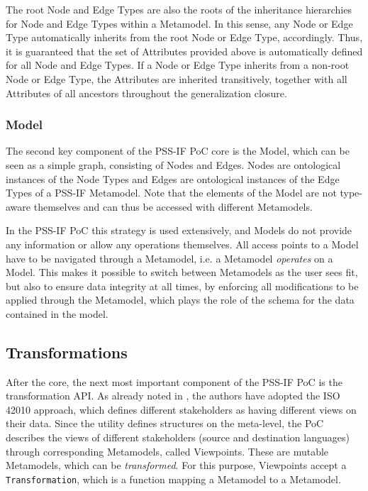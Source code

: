 The root Node and Edge Types are also the roots of the inheritance hierarchies for Node and Edge Types within a Metamodel. In this sense, any Node or Edge Type automatically inherits from the root Node or Edge Type, accordingly. Thus, it is guaranteed that the set of Attributes provided above is automatically defined for all Node and Edge Types. If a Node or Edge Type inherits from a non-root Node or Edge Type, the Attributes are inherited transitively, together with all Attributes of all ancestors throughout the generalization closure.

\subsubsection{Model}

The second key component of the PSS-IF PoC core is the Model, which can be seen as a simple graph, consisting of Nodes and Edges. Nodes are ontological instances of the Node Types and Edges are ontological instances of the Edge Types of a PSS-IF Metamodel. Note that the elements of the Model are not type-aware themselves and can thus be accessed with different Metamodels.

In the PSS-IF PoC this strategy is used extensively, and Models do not provide any information or allow any operations themselves. All access points to a Model have to be navigated through a Metamodel, i.e. a Metamodel \textit{operates} on a Model. This makes it possible to switch between Metamodels as the user sees fit, but also to ensure data integrity at all times, by enforcing all modifications to be applied through the Metamodel, which plays the role of the schema for the data contained in the model.

\subsection{Transformations}

After the core, the next most important component of the PSS-IF PoC is the transformation API. As already noted in , the authors have adopted the ISO 42010 approach, which defines different stakeholders as having different views on their data. Since the utility defines structures on the meta-level, the PoC describes the views of different stakeholders (source and destination languages) through corresponding Metamodels, called Viewpoints. These are mutable Metamodels, which can be \textit{transformed}. For this purpose, Viewpoints accept a \texttt{Transformation}, which is a function mapping a Metamodel to a Metamodel.

